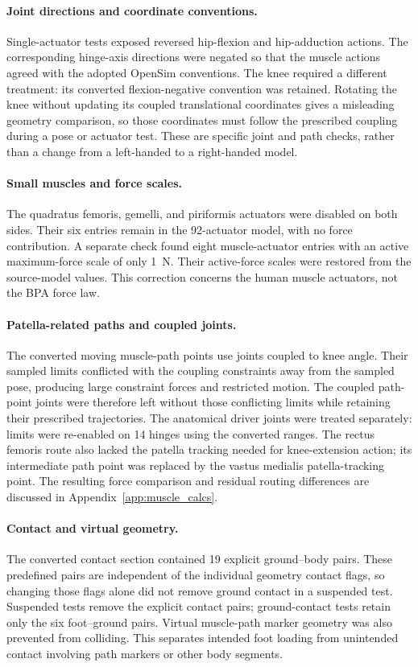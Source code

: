 \paragraph{Joint directions and coordinate conventions.}
Single-actuator tests exposed reversed hip-flexion and hip-adduction actions. The corresponding hinge-axis directions were negated so that the muscle actions agreed with the adopted OpenSim conventions. The knee required a different treatment: its converted flexion-negative convention was retained. Rotating the knee without updating its coupled translational coordinates gives a misleading geometry comparison, so those coordinates must follow the prescribed coupling during a pose or actuator test. These are specific joint and path checks, rather than a change from a left-handed to a right-handed model.

\paragraph{Small muscles and force scales.}
The quadratus femoris, gemelli, and piriformis actuators were disabled on both sides. Their six entries remain in the 92-actuator model, with no force contribution. A separate check found eight muscle-actuator entries with an active maximum-force scale of only \qty{1}{\newton}. Their active-force scales were restored from the source-model values. This correction concerns the human muscle actuators, not the BPA force law.

\paragraph{Patella-related paths and coupled joints.}
The converted moving muscle-path points use joints coupled to knee angle. Their sampled limits conflicted with the coupling constraints away from the sampled pose, producing large constraint forces and restricted motion. The coupled path-point joints were therefore left without those conflicting limits while retaining their prescribed trajectories. The anatomical driver joints were treated separately: limits were re-enabled on 14 hinges using the converted ranges. The rectus femoris route also lacked the patella tracking needed for knee-extension action; its intermediate path point was replaced by the vastus medialis patella-tracking point. The resulting force comparison and residual routing differences are discussed in Appendix~\ref{app:muscle_calcs}.

\paragraph{Contact and virtual geometry.}
The converted contact section contained 19 explicit ground--body pairs. These predefined pairs are independent of the individual geometry contact flags, so changing those flags alone did not remove ground contact in a suspended test. Suspended tests remove the explicit contact pairs; ground-contact tests retain only the six foot--ground pairs. Virtual muscle-path marker geometry was also prevented from colliding. This separates intended foot loading from unintended contact involving path markers or other body segments.

